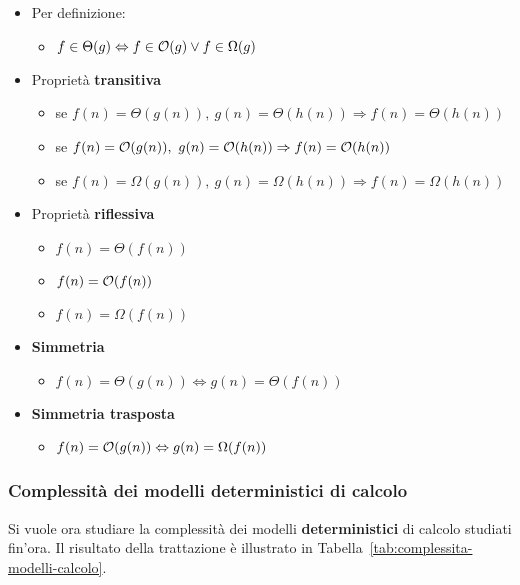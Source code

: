 \documentclass[italian, 10pt]{article}
\begin{document}
\begin{itemize}
  \item Per definizione:
        \begin{itemize}
          \item \(f \in \Theta(g) \Leftrightarrow f \in \mathcal{O}(g) \lor f \in \Omega(g)\)
        \end{itemize}
  \item Proprietà \textbf{transitiva}
        \begin{itemize}
          \item se \(f(n) = \Theta(g(n)),\ g(n) = \Theta(h(n)) \Rightarrow f(n) = \Theta(h(n))\)
          \item se \(f(n) = \mathcal{O}(g(n)),\ g(n) = \mathcal{O}(h(n)) \Rightarrow f(n) = \mathcal{O}(h(n))\)
          \item se \(f(n) = \Omega(g(n)),\ g(n) = \Omega(h(n)) \Rightarrow f(n) = \Omega(h(n))\)
        \end{itemize}
  \item Proprietà \textbf{riflessiva}
        \begin{itemize}
          \item \(f(n) = \Theta(f(n))\)
          \item \(f(n) = \mathcal{O}(f(n))\)
          \item \(f(n) = \Omega(f(n))\)
        \end{itemize}
  \item \textbf{Simmetria}
        \begin{itemize}
          \item \(f(n) = \Theta(g(n)) \Leftrightarrow g(n) = \Theta(f(n))\)
        \end{itemize}
  \item \textbf{Simmetria trasposta}
        \begin{itemize}
          \item \(f(n) = \mathcal{O}(g(n)) \Leftrightarrow g(n) = \Omega(f(n))\)
        \end{itemize}
\end{itemize}

\subsubsection{Complessità dei modelli deterministici di calcolo}

Si vuole ora studiare la complessità dei modelli \textbf{deterministici} di calcolo studiati fin'ora.
Il risultato della trattazione è illustrato in Tabella~\ref{tab:complessita-modelli-calcolo}.
\end{document}
